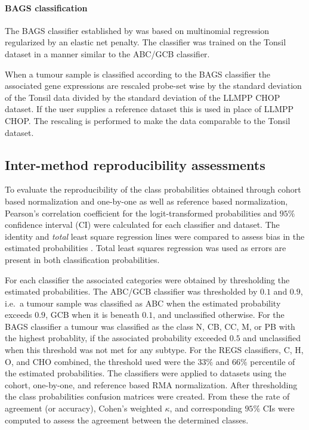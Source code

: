 \documentclass[10pt,letterpaper]{article}
\begin{document}
\paragraph{BAGS classification}
The BAGS classifier established by \cite{DybkaerBoegsted2015} was based on multinomial regression regularized by an elastic net penalty.
The classifier was trained on the Tonsil dataset in a manner similar to the ABC/GCB classifier.

When a tumour sample is classified according to the BAGS classifier the associated gene expressions are rescaled probe-set wise by the standard deviation of the Tonsil data divided by the standard deviation of the LLMPP CHOP dataset.
If the user supplies a reference dataset this is used in place of LLMPP CHOP.
The rescaling is performed to make the data comparable to the Tonsil dataset.


\subsection*{Inter-method reproducibility assessments}
To evaluate the reproducibility of the class probabilities obtained through cohort based normalization and one-by-one as well as reference based normalization, Pearson's correlation coefficient for the logit-transformed probabilities and $95\%$ confidence interval (CI) were calculated for each classifier and dataset.
The identity and \emph{total} least square regression lines were compared to assess bias in the estimated probabilities \cite{CHEN1989}.
Total least squares regression was used as errors are present in both classification probabilities.

For each classifier the associated categories were obtained by thresholding the estimated probabilities.
The ABC/GCB classifier was thresholded by $0.1$ and $0.9$, i.e.\ a tumour sample was classified as ABC when the estimated probability exceeds $0.9$, GCB when it is beneath $0.1$, and unclassified otherwise.
For the BAGS classifier a tumour was classified as the class N, CB, CC, M, or PB with the highest probablity, if the associated probability exceeded $0.5$ and unclassified when this threshold was not met for any subtype.
For the REGS classifiers, C, H, O, and CHO combined, the threshold used were the $33\%$ and $66\%$ percentile of the estimated probabilities.
The classifiers were applied to datasets using the cohort, one-by-one, and reference based RMA normalization.
After thresholding the class probabilities confusion matrices were created.
From these the rate of agreement (or accuracy), Cohen's weighted $\kappa$, and corresponding $95\%$ CIs were computed to assess the agreement between the determined classes.
\end{document}
